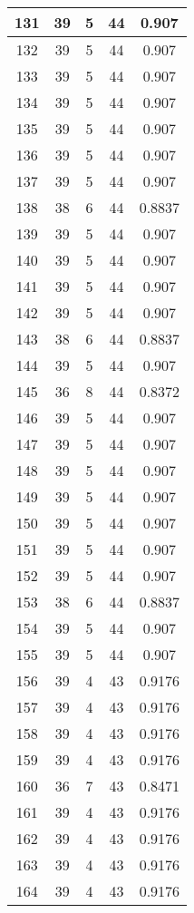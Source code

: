 \documentclass[letterpaper, 12pt]{article}
\begin{document}
\begin{longtable}{|c|c|c|c|c|}
\hline
131 & 39 & 5 & 44 & 0.907 \\
\hline
132 & 39 & 5 & 44 & 0.907 \\
\hline
133 & 39 & 5 & 44 & 0.907 \\
\hline
134 & 39 & 5 & 44 & 0.907 \\
\hline
135 & 39 & 5 & 44 & 0.907 \\
\hline
136 & 39 & 5 & 44 & 0.907 \\
\hline
137 & 39 & 5 & 44 & 0.907 \\
\hline
138 & 38 & 6 & 44 & 0.8837 \\
\hline
139 & 39 & 5 & 44 & 0.907 \\
\hline
140 & 39 & 5 & 44 & 0.907 \\
\hline
141 & 39 & 5 & 44 & 0.907 \\
\hline
142 & 39 & 5 & 44 & 0.907 \\
\hline
143 & 38 & 6 & 44 & 0.8837 \\
\hline
144 & 39 & 5 & 44 & 0.907 \\
\hline
145 & 36 & 8 & 44 & 0.8372 \\
\hline
146 & 39 & 5 & 44 & 0.907 \\
\hline
147 & 39 & 5 & 44 & 0.907 \\
\hline
148 & 39 & 5 & 44 & 0.907 \\
\hline
149 & 39 & 5 & 44 & 0.907 \\
\hline
150 & 39 & 5 & 44 & 0.907 \\
\hline
151 & 39 & 5 & 44 & 0.907 \\
\hline
152 & 39 & 5 & 44 & 0.907 \\
\hline
153 & 38 & 6 & 44 & 0.8837 \\
\hline
154 & 39 & 5 & 44 & 0.907 \\
\hline
155 & 39 & 5 & 44 & 0.907 \\
\hline
156 & 39 & 4 & 43 & 0.9176 \\
\hline
157 & 39 & 4 & 43 & 0.9176 \\
\hline
158 & 39 & 4 & 43 & 0.9176 \\
\hline
159 & 39 & 4 & 43 & 0.9176 \\
\hline
160 & 36 & 7 & 43 & 0.8471 \\
\hline
161 & 39 & 4 & 43 & 0.9176 \\
\hline
162 & 39 & 4 & 43 & 0.9176 \\
\hline
163 & 39 & 4 & 43 & 0.9176 \\
\hline
164 & 39 & 4 & 43 & 0.9176 \\
\hline

\end{longtable}
\end{document}
